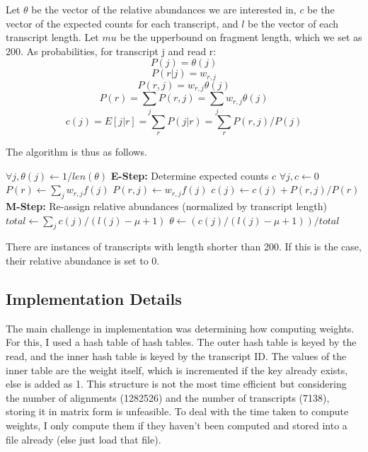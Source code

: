 \documentclass{article}
\begin{document}
\break

Let $\theta$ be the vector of the relative abundances we are interested in, $c$ be the vector of the expected counts for each transcript, and $l$ be the vector of each transcript length. Let $mu$ be the upperbound on fragment length, which we set as 200. As probabilities, for transcript j and read r:
$$P(j) = \theta(j)$$
$$P(r|j) = w_{r,j}$$
$$P(r, j) = w_{r, j}\theta(j)$$
$$P(r) = \sum_{j}{P(r,j)} = \sum_{j}{w_{r,j}\theta(j)}$$
$$c(j) = E[j|r] = \sum_{r}{P(j|r)} = \sum_{r}{P(r,j)/P(j)}$$

The algorithm is thus as follows.\\

\begin{algorithmic}
    \State $\forall j, \theta(j) \gets 1/len(\theta)$
        \State \textbf{E-Step:} Determine expected counts $c$
        \State $\forall j, c \gets 0$
            \State $P(r) \gets \sum_{j}{w_{r,j}f(j)}$
                \State $P(r,j) \gets w_{r,j}f(j)$
                \State $c(j) \gets c(j) + P(r, j)/P(r)$
            \EndFor
        \EndFor
        \State \textbf{M-Step:} Re-assign relative abundances (normalized by transcript length)
        \State $total \gets \sum_{j}{c(j)/(l(j)-\mu + 1)}$
            \State $\theta \gets (c(j)/(l(j)-\mu + 1))/total$
        \EndFor

    \EndWhile
\end{algorithmic}
\vspace{1em}
There are instances of transcripts with length shorter than 200. If this is the case, their relative abundance is set to 0.

\break
\subsection*{Implementation Details}

The main challenge in implementation was determining how computing weights. For this, I used a hash table of hash tables. The outer hash table is keyed by the read, and the inner hash table is keyed by the transcript ID. The values of the inner table are the weight itself, which is incremented if the key already exists, else is added as 1. This structure is not the most time efficient but considering the number of alignments (1282526) and the number of transcripts (7138), storing it in matrix form is unfeasible. To deal with the time taken to compute weights, I only compute them if they haven't been computed and stored into a file already (else just load that file).
\\
\end{document}
